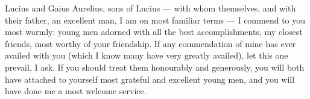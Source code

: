 

 Lucius and Gaius Aurelius, sons of Lucius — with whom themselves, and with their father, an excellent man, I am on most familiar terms — I commend to you most warmly: young men adorned with all the best accomplishments, my closest friends, most worthy of your friendship. If any commendation of mine has ever availed with you (which I know many have very greatly availed), let this one prevail, I ask. If you should treat them honourably and generously, you will both have attached to yourself most grateful and excellent young men, and you will have done me a most welcome service.
